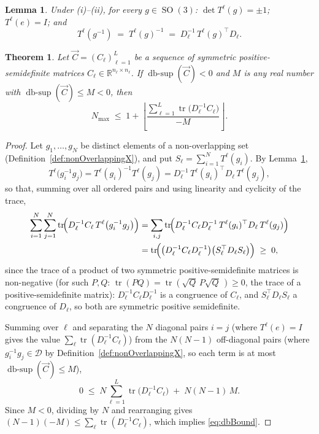\documentclass[10pt,a4paper]{amsart}
\newtheorem{lemma}{Lemma}
\newtheorem{theorem}{Theorem}
\newcommand{\Dom}{\mathcal{D}}
\newcommand{\R}{\mathbb{R}}
\DeclareMathOperator{\SO}{SO}
\DeclareMathOperator{\dbsup}{db\text{-}sup}
\DeclareMathOperator{\tr}{tr}
\begin{document}
\begin{lemma}\label{lem:Torth}
Under (i)--(ii), for every $g\in\SO(3)$: $\det T^\ell(g)=\pm1$; $T^\ell(e)=I$; and
\[
T^\ell(g^{-1})\;=\;T^\ell(g)^{-1}\;=\;D_\ell^{-1}\,T^\ell(g)^\top D_\ell .
\]
\end{lemma}

\begin{theorem}\label{thm:dbBound}
Let $\overrightarrow C=(C_\ell)_{\ell=1}^{L}$ be a sequence of symmetric positive-semidefinite
matrices $C_\ell\in\R^{n_\ell\times n_\ell}$. If $\dbsup(\overrightarrow C)<0$ and $M$ is any real
number with $\dbsup(\overrightarrow C)\le M<0$, then
\begin{equation}\label{eq:dbBound}
N_{\max}\;\le\;1+\left\lfloor
\frac{\sum_{\ell=1}^{L}\tr\bigl(D_\ell^{-1}C_\ell\bigr)}{-M}\right\rfloor .
\end{equation}
\end{theorem}

\begin{proof}
Let $g_1,\dots,g_N$ be distinct elements of a non-overlapping set
(Definition~\ref{def:nonOverlappingX}), and put $S_\ell=\sum_{i=1}^{N}T^\ell(g_i)$. By
Lemma~\ref{lem:Torth},
\[
T^\ell\bigl(g_i^{-1}g_j\bigr)=T^\ell(g_i)^{-1}T^\ell(g_j)
=D_\ell^{-1}\,T^\ell(g_i)^\top D_\ell\,T^\ell(g_j),
\]
so that, summing over all ordered pairs and using linearity and cyclicity of the trace,
\begin{align*}
\sum_{i=1}^{N}\sum_{j=1}^{N}\tr\!\Bigl(D_\ell^{-1}C_\ell\,T^\ell\bigl(g_i^{-1}g_j\bigr)\Bigr)
&=\sum_{i,j}\tr\!\Bigl(D_\ell^{-1}C_\ell D_\ell^{-1}\,T^\ell(g_i)^\top D_\ell\,T^\ell(g_j)\Bigr)\\
&=\tr\!\Bigl(\bigl(D_\ell^{-1}C_\ell D_\ell^{-1}\bigr)\bigl(S_\ell^\top D_\ell S_\ell\bigr)\Bigr)
\;\ge\;0,
\end{align*}
since the trace of a product of two symmetric positive-semidefinite matrices is non-negative
(for such $P,Q$: $\tr(PQ)=\tr(\sqrt Q\,P\sqrt Q\,)\ge0$, the trace of a positive-semidefinite
matrix): $D_\ell^{-1}C_\ell D_\ell^{-1}$ is a congruence of $C_\ell$, and
$S_\ell^\top D_\ell S_\ell$ a congruence of $D_\ell$, so both are symmetric positive semidefinite.

Summing over $\ell$ and separating the $N$ diagonal pairs $i=j$ (where
$T^\ell(e)=I$ gives the value $\sum_\ell\tr(D_\ell^{-1}C_\ell)$) from the $N(N-1)$ off-diagonal
pairs (where $g_i^{-1}g_j\in\Dom$ by Definition~\ref{def:nonOverlappingX}, so each term is at most
$\dbsup(\overrightarrow C)\le M$),
\[
0\;\le\;N\sum_{\ell=1}^{L}\tr\bigl(D_\ell^{-1}C_\ell\bigr)\;+\;N(N-1)\,M .
\]
Since $M<0$, dividing by $N$ and rearranging gives
$(N-1)(-M)\le\sum_\ell\tr(D_\ell^{-1}C_\ell)$, which implies \eqref{eq:dbBound}.
\end{proof}
\end{document}
